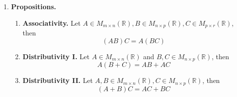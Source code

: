 \documentclass[oneside, 12pt]{book}
\newcommand{\settag}[1]{\renewcommand{\theenumi}{#1}}
\newcommand{\R}{\mathbb{R}}
\newcommand{\tbf}[1]{\textbf{#1}}
\newcommand{\mat}[2]{M_{#1 \times #2}(\R)}
\newcommand{\para}[1]{\item \tbf{#1}}
\begin{document}
\begin{enumerate}
    \settag{2.5.14}
    \para{Propositions.}
    \begin{enumerate}
        \item \tbf{Associativity.} Let $A\in M_{m\times n}(\R), B\in M_{n\times p}(\R), C\in M_{p\times r}(\R)$, then
        \begin{equation*}
            (AB)C = A(BC)
        \end{equation*}
        
        \item \tbf{Distributivity I.} Let $A\in M_{m\times n}(\R)$ and $B, C\in M_{n\times p}(\R)$, then
        \begin{equation*}
            A(B+C) = AB + AC
        \end{equation*}
        
        \item \tbf{Distributivity II.} Let $A, B\in \mat{m}{n}, C\in \mat{n}{p}$, then
        \begin{equation*}
            (A+B)C = AC + BC
        \end{equation*}
    \end{enumerate}
\end{enumerate}
\end{document}
